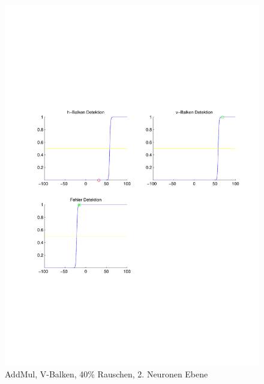 \begin{figure}[hbt]
\begin{minipage}{0.8 \textwidth}
		\includegraphics[width=\textwidth]{./Bilder/Auswertung/Endergebnis/TypeAddMul_Rauschen40_V_Line_Layer2}
		\caption{AddMul, V-Balken, 40\% Rauschen, 2. Neuronen Ebene}
		\label{AddMul_V_40_2}
	\end{minipage}
\end{figure}

